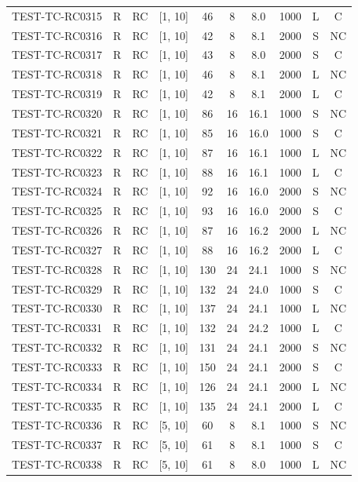 \begin{longtable}{lccccccccc}
TEST-TC-RC0315 & R & RC & [1, 10] & 46 & 8 & 8.0 & 1000 & L & C \\
TEST-TC-RC0316 & R & RC & [1, 10] & 42 & 8 & 8.1 & 2000 & S & NC \\
TEST-TC-RC0317 & R & RC & [1, 10] & 43 & 8 & 8.0 & 2000 & S & C \\
TEST-TC-RC0318 & R & RC & [1, 10] & 46 & 8 & 8.1 & 2000 & L & NC \\
TEST-TC-RC0319 & R & RC & [1, 10] & 42 & 8 & 8.1 & 2000 & L & C \\
TEST-TC-RC0320 & R & RC & [1, 10] & 86 & 16 & 16.1 & 1000 & S & NC \\
TEST-TC-RC0321 & R & RC & [1, 10] & 85 & 16 & 16.0 & 1000 & S & C \\
TEST-TC-RC0322 & R & RC & [1, 10] & 87 & 16 & 16.1 & 1000 & L & NC \\
TEST-TC-RC0323 & R & RC & [1, 10] & 88 & 16 & 16.1 & 1000 & L & C \\
TEST-TC-RC0324 & R & RC & [1, 10] & 92 & 16 & 16.0 & 2000 & S & NC \\
TEST-TC-RC0325 & R & RC & [1, 10] & 93 & 16 & 16.0 & 2000 & S & C \\
TEST-TC-RC0326 & R & RC & [1, 10] & 87 & 16 & 16.2 & 2000 & L & NC \\
TEST-TC-RC0327 & R & RC & [1, 10] & 88 & 16 & 16.2 & 2000 & L & C \\
TEST-TC-RC0328 & R & RC & [1, 10] & 130 & 24 & 24.1 & 1000 & S & NC \\
TEST-TC-RC0329 & R & RC & [1, 10] & 132 & 24 & 24.0 & 1000 & S & C \\
TEST-TC-RC0330 & R & RC & [1, 10] & 137 & 24 & 24.1 & 1000 & L & NC \\
TEST-TC-RC0331 & R & RC & [1, 10] & 132 & 24 & 24.2 & 1000 & L & C \\
TEST-TC-RC0332 & R & RC & [1, 10] & 131 & 24 & 24.1 & 2000 & S & NC \\
TEST-TC-RC0333 & R & RC & [1, 10] & 150 & 24 & 24.1 & 2000 & S & C \\
TEST-TC-RC0334 & R & RC & [1, 10] & 126 & 24 & 24.1 & 2000 & L & NC \\
TEST-TC-RC0335 & R & RC & [1, 10] & 135 & 24 & 24.1 & 2000 & L & C \\
TEST-TC-RC0336 & R & RC & [5, 10] & 60 & 8 & 8.1 & 1000 & S & NC \\
TEST-TC-RC0337 & R & RC & [5, 10] & 61 & 8 & 8.1 & 1000 & S & C \\
TEST-TC-RC0338 & R & RC & [5, 10] & 61 & 8 & 8.0 & 1000 & L & NC \\

\end{longtable}
